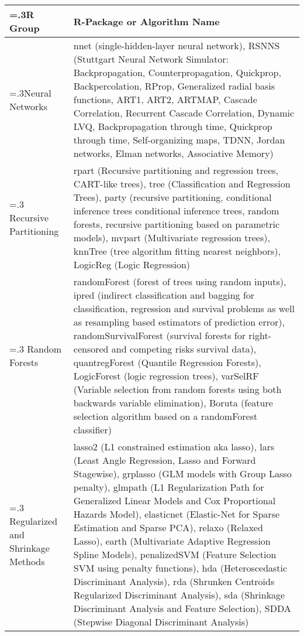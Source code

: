 \documentclass[a4paper, 11pt]{article}
\begin{document}
\begin{table}[htp]
	\centering\footnotesize
		\begin{tabularx}{\textwidth}{>{\hsize=.3\hsize}XX}
		\toprule
		\textbf{R Group} & \textbf{R-Package or Algorithm Name} \\ 
		\toprule
		Neural Networks & nnet (single-hidden-layer neural network), RSNNS (Stuttgart Neural Network Simulator: Backpropagation, Counterpropagation, Quickprop, Backpercolation, RProp, Generalized radial basis functions, ART1, ART2, ARTMAP, Cascade Correlation, Recurrent Cascade Correlation, Dynamic LVQ, Backpropagation through time, Quickprop through time, Self-organizing maps, TDNN, Jordan networks, Elman networks, Associative Memory) \\
		\midrule
		Recursive Partitioning & rpart (Recursive partitioning and regression trees, CART-like trees), tree (Classification and Regression Trees),  party (recursive partitioning, conditional inference trees conditional inference trees, random forests, recursive partitioning based on parametric models), mvpart (Multivariate regression trees), knnTree (tree algorithm fitting nearest neighbors), LogicReg (Logic Regression) \\
		\midrule
		Random Forests & randomForest (forest of trees using random inputs), ipred (indirect classification and bagging for classification, regression and survival problems as well as resampling based estimators of prediction error), randomSurvivalForest (survival forests for right-censored and competing risks survival data), quantregForest (Quantile Regression Forests), LogicForest (logic regression trees), varSelRF (Variable selection from random forests using both backwards variable elimination), Boruta (feature selection algorithm based on a randomForest classifier) \\
		\midrule
		Regularized and Shrinkage Methods & lasso2 (L1 constrained estimation aka lasso), lars (Least Angle Regression, Lasso and Forward Stagewise), grplasso (GLM models with Group Lasso penalty), glmpath (L1 Regularization Path for Generalized Linear Models and Cox Proportional Hazards Model), elasticnet (Elastic-Net for Sparse Estimation and Sparse PCA), relaxo (Relaxed Lasso),  earth (Multivariate Adaptive Regression Spline Models), penalizedSVM (Feature Selection SVM using penalty functions), hda (Heteroscedastic Discriminant Analysis), rda (Shrunken Centroids Regularized Discriminant Analysis), sda (Shrinkage Discriminant Analysis and Feature Selection), SDDA (Stepwise Diagonal Discriminant Analysis) \\

\end{tabularx}
\end{table}
\end{document}
